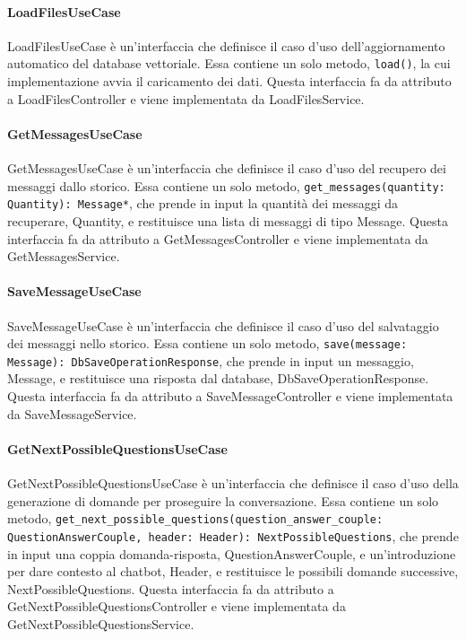\paragraph{LoadFilesUseCase}
\label{sec:load_files_use_case}
LoadFilesUseCase è un'interfaccia che definisce il caso d'uso dell'aggiornamento automatico del database vettoriale. Essa contiene un solo metodo, \texttt{load()}, la cui implementazione avvia il caricamento dei dati. Questa interfaccia fa da attributo a LoadFilesController e viene implementata da LoadFilesService.

\paragraph{GetMessagesUseCase}
\label{sec:get_messages_use_case}
GetMessagesUseCase è un'interfaccia che definisce il caso d'uso del recupero dei messaggi dallo storico. Essa contiene un solo metodo, \texttt{get\_messages(quantity: Quantity): Message*}, che prende in input la quantità dei messaggi da recuperare, Quantity, e restituisce una lista di messaggi di tipo Message. Questa interfaccia fa da attributo a GetMessagesController e viene implementata da GetMessagesService.

\paragraph{SaveMessageUseCase}
\label{sec:save_message_use_case}
SaveMessageUseCase è un'interfaccia che definisce il caso d'uso del salvataggio dei messaggi nello storico. Essa contiene un solo metodo, \texttt{save(message: Message): DbSaveOperationResponse}, che prende in input un messaggio, Message, e restituisce una risposta dal database, DbSaveOperationResponse. Questa interfaccia fa da attributo a SaveMessageController e viene implementata da SaveMessageService.

\paragraph{GetNextPossibleQuestionsUseCase}
\label{sec:get_next_possible_questions_use_case}
GetNextPossibleQuestionsUseCase è un'interfaccia che definisce il caso d'uso della generazione di domande per proseguire la conversazione. Essa contiene un solo metodo, \texttt{get\_next\_possible\_questions(question\_answer\_couple: QuestionAnswerCouple, header: Header): NextPossibleQuestions}, che prende in input una coppia domanda-risposta, QuestionAnswerCouple, e un'introduzione per dare contesto al chatbot, Header, e restituisce le possibili domande successive, NextPossibleQuestions. Questa interfaccia fa da attributo a GetNextPossibleQuestionsController e viene implementata da GetNextPossibleQuestionsService.

